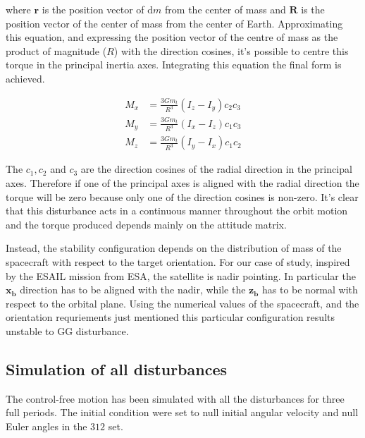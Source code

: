 where $\boldsymbol{r}$ is the position vector of $\mathrm{d}m$ from the center of mass and $\boldsymbol{R}$ is the position vector of the center of mass from the center of Earth.
Approximating this equation, and expressing the position vector of the centre of mass as the product of magnitude (\( R \)) with the direction cosines, 
it’s possible to centre this torque in the principal inertia axes. Integrating this equation the final form is achieved.

\begin{equation}
	\begin{aligned}
		M_x &= \frac{3Gm_t}{R^3} (I_z - I_y)c_2c_3 \\
		M_y &= \frac{3Gm_t}{R^3} (I_x - I_z)c_1c_3 \\
		M_z &= \frac{3Gm_t}{R^3} (I_y - I_x)c_1c_2
	\end{aligned}
\end{equation}


The \( c_1, c_2 \) and \( c_3 \) are the direction cosines of the radial direction in the principal axes. 
Therefore if one of the principal axes is aligned with the radial direction the torque will be zero because only one of the direction cosines is non-zero.
It's clear that this disturbance acts in a continuous manner throughout the orbit motion and the torque produced depends mainly on the attitude matrix.

Instead, the stability configuration depends on the distribution of mass of the spacecraft with respect to the target orientation. For our case of study, 
inspired by the ESAIL mission from ESA, the satellite is nadir pointing. In particular the $\boldsymbol{x_b}$ direction has to be aligned with the nadir, while the $\boldsymbol{z_b}$ has to be normal with respect to the orbital plane. Using the numerical values of the spacecraft, and the orientation requriements just mentioned this particular configuration results unstable to GG disturbance.


\subsection{Simulation of all disturbances}
\label{subsec:sim_disturbances}


The control-free motion has been simulated with all the disturbances for three full periods. 
The initial condition were set to null initial angular velocity and 
null Euler angles in the $312$ set.


